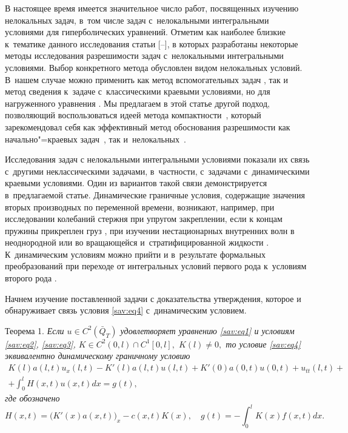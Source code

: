 \rm 
\smallskip

В настоящее время имеется значительное число работ, посвященных изучению нелокальных задач, в~том числе задач с~нелокальными  интегральными условиями для гиперболических уравнений. 
Отметим как наиболее близкие к~тематике данного исследования статьи [--],  в которых  разработаны некоторые методы исследования разрешимости задач с~нелокальными интегральными условиями. 
Выбор конкретного метода обусловлен видом нелокальных условий. 
В~нашем случае можно применить как метод вспомогательных задач  \cite{pulkinals:bib:P04},  так и метод сведения к~задаче с~классическими краевыми условиями, но для нагруженного уравнения \cite{pulkinals:bib:K-P}.
Мы предлагаем в этой статье другой подход, позволяющий воспользоваться идеей метода компактности~\cite{pulkinals:bib:lions}, который зарекомендовал себя как эффективный метод обоснования разрешимости как начально"=краевых задач~\cite{pulkinals:bib:lad},
так и~нелокальных~\cite{pulkinals:bib:pbook}.

Исследования задач с нелокальными интегральными условиями показали их связь с~другими неклассическими задачами, в~частности, с~задачами с~динамическими краевыми условиями. 
Один из вариантов такой связи демонстрируется в~предлагаемой статье.
Динамические граничные условия, содержащие  значения вторых производных  по переменной времени, возникают, например, при исследовании колебаний стержня при упругом закреплении, если к концам пружины прикреплен груз \cite{pulkinals:bib:T-S, pulkinals:bib:fedot},  при изучении нестационарных внутренних волн в неоднородной или во вращающейся и~стратифицированной жидкости \cite{pulkinals:bib:larkin, pulkinals:bib:korp}. 
К~динамическим условиям можно прийти и в~результате формальных преобразований при переходе от интегральных условий первого рода к~условиям второго рода \cite{pulkinals:bib:Pejde}.

\smallskip

Начнем изучение поставленной задачи с доказательства утверждения, которое  и обнаруживает связь условия \eqref{sav:eq4} с~динамическим условием.

\smallskip

\hypertarget{sav:th1}{}

{\small\sc Теорема 1.} \it 
Если $u\in C^2( \bar {Q}_T)$  удовлетворяет уравнению \rm \eqref{sav:eq1} \it 
и условиям  \rm \eqref{sav:eq2}, \eqref{sav:eq3}, \it
$K\in C^2(0, l)\cap C^1[0, l],$ $ K(l)\ne 0,$
то условие \eqref{sav:eq4} эквивалентно динамическому граничному условию \pagebreak
\begin{multline}
 K(l)a(l,t)u_x(l,t)-K'(l)a(l,t)u(l,t)+K'(0)a(0,t)u(0, t)+u_{tt}(l,t)+
\\
 \label{sav:eq5}
+ \int _0^lH(x,t)u(x,t)dx=g(t),
\end{multline}
где обозначено
$$
H(x,t)=\bigl(K'(x)a(x,t)\bigr)_x-c(x,t)K(x),  \quad  g(t)=- \int _0^lK(x)f(x,t)dx.$$

